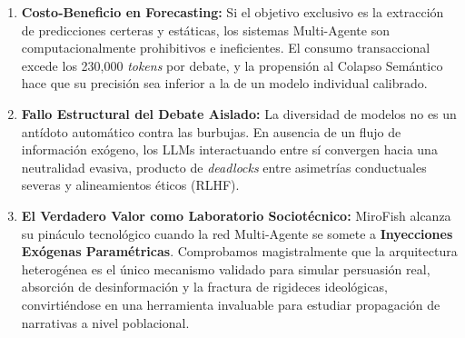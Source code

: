 ﻿\documentclass{article}
\begin{document}
\begin{enumerate}
    \item \textbf{Costo-Beneficio en Forecasting:} Si el objetivo exclusivo es la extracción de predicciones certeras y estáticas, los sistemas Multi-Agente son computacionalmente prohibitivos e ineficientes. El consumo transaccional excede los 230,000 \textit{tokens} por debate, y la propensión al Colapso Semántico hace que su precisión sea inferior a la de un modelo individual calibrado.
    \item \textbf{Fallo Estructural del Debate Aislado:} La diversidad de modelos no es un antídoto automático contra las burbujas. En ausencia de un flujo de información exógeno, los LLMs interactuando entre sí convergen hacia una neutralidad evasiva, producto de \textit{deadlocks} entre asimetrías conductuales severas y alineamientos éticos (RLHF).
    \item \textbf{El Verdadero Valor como Laboratorio Sociotécnico:} MiroFish alcanza su pináculo tecnológico cuando la red Multi-Agente se somete a \textbf{Inyecciones Exógenas Paramétricas}. Comprobamos magistralmente que la arquitectura heterogénea es el único mecanismo validado para simular persuasión real, absorción de desinformación y la fractura de rigideces ideológicas, convirtiéndose en una herramienta invaluable para estudiar propagación de narrativas a nivel poblacional.
\end{enumerate}
\end{document}
